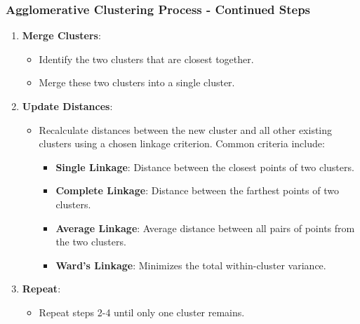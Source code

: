 \documentclass[aspectratio=169]{beamer}
\begin{document}
\begin{frame}[fragile]
    \frametitle{Agglomerative Clustering Process - Continued Steps}
    \begin{enumerate}[resume]
        \item \textbf{Merge Clusters}:
        \begin{itemize}
            \item Identify the two clusters that are closest together.
            \item Merge these two clusters into a single cluster.
        \end{itemize}
        
        \item \textbf{Update Distances}:
        \begin{itemize}
            \item Recalculate distances between the new cluster and all other existing clusters using a chosen linkage criterion. Common criteria include:
                \begin{itemize}
                    \item \textbf{Single Linkage}: Distance between the closest points of two clusters.
                    \item \textbf{Complete Linkage}: Distance between the farthest points of two clusters.
                    \item \textbf{Average Linkage}: Average distance between all pairs of points from the two clusters.
                    \item \textbf{Ward’s Linkage}: Minimizes the total within-cluster variance.
                \end{itemize}
        \end{itemize}

        \item \textbf{Repeat}:
        \begin{itemize}
            \item Repeat steps 2-4 until only one cluster remains.
        \end{itemize}
    \end{enumerate}
\end{frame}
\end{document}
